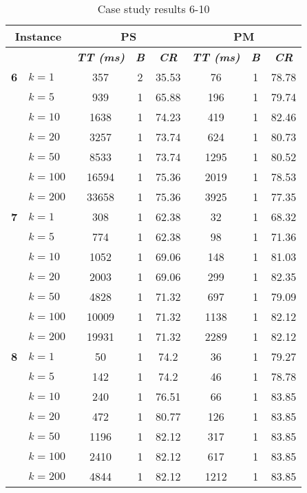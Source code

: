     \begin{table}[htbp]
    \caption{Case study results 6-10}
    \centering
    \begin{tabular}{|l|l|c|c|c|c|c|c|}
    \hline
    \multicolumn{ 2}{|c|}{\textbf{Instance}} & \multicolumn{ 3}{c|}{\textbf{PS}} & \multicolumn{ 3}{c|}{\textbf{PM}} \\ \hline
    \multicolumn{ 2}{|l|}{} & \textbf{\textit{TT (ms)}} & \textbf{\textit{B}} & \textbf{\textit{CR}} & \textbf{\textit{TT (ms)}} & \textbf{\textit{B}} & \textbf{\textit{CR}} \\ \hline
    \multicolumn{1}{|r|}{\textbf{6}} & $k=1$ & 357 & 2 & 35.53 & 76 & 1 & 78.78 \\ 
     & $k=5$ & 939 & 1 & 65.88 & 196 & 1 & 79.74 \\ 
     & $k=10$ & 1638 & 1 & 74.23 & 419 & 1 & 82.46 \\ 
     & $k=20$ & 3257 & 1 & 73.74 & 624 & 1 & 80.73 \\ 
     & $k=50$ & 8533 & 1 & 73.74 & 1295 & 1 & 80.52 \\ 
     & $k=100$ & 16594 & 1 & 75.36 & 2019 & 1 & 78.53 \\ 
     & $k=200$ & 33658 & 1 & 75.36 & 3925 & 1 & 77.35 \\ \hline
    \multicolumn{1}{|r|}{\textbf{7}} & $k=1$ & 308 & 1 & 62.38 & 32 & 1 & 68.32 \\ 
     & $k=5$ & 774 & 1 & 62.38 & 98 & 1 & 71.36 \\ 
     & $k=10$ & 1052 & 1 & 69.06 & 148 & 1 & 81.03 \\ 
     & $k=20$ & 2003 & 1 & 69.06 & 299 & 1 & 82.35 \\ 
     & $k=50$ & 4828 & 1 & 71.32 & 697 & 1 & 79.09 \\ 
     & $k=100$ & 10009 & 1 & 71.32 & 1138 & 1 & 82.12 \\ 
     & $k=200$ & 19931 & 1 & 71.32 & 2289 & 1 & 82.12 \\ \hline
    \multicolumn{1}{|r|}{\textbf{8}} & $k=1$ & 50 & 1 & 74.2 & 36 & 1 & 79.27 \\ 
     & $k=5$ & 142 & 1 & 74.2 & 46 & 1 & 78.78 \\ 
     & $k=10$ & 240 & 1 & 76.51 & 66 & 1 & 83.85 \\ 
     & $k=20$ & 472 & 1 & 80.77 & 126 & 1 & 83.85 \\ 
     & $k=50$ & 1196 & 1 & 82.12 & 317 & 1 & 83.85 \\ 
     & $k=100$ & 2410 & 1 & 82.12 & 617 & 1 & 83.85 \\ 
     & $k=200$ & 4844 & 1 & 82.12 & 1212 & 1 & 83.85 \\ \hline

\end{tabular}
\end{table}
